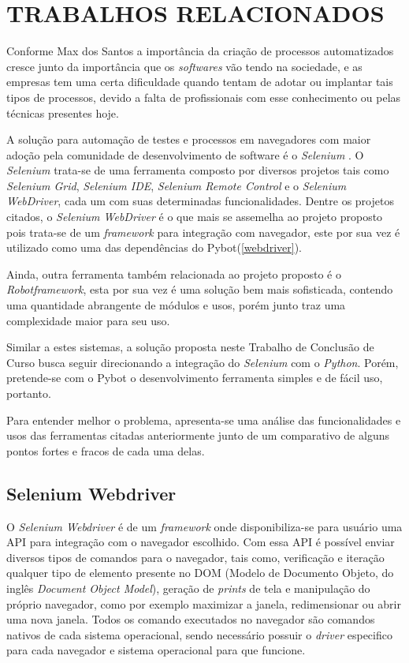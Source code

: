 %
%

\chapter{TRABALHOS RELACIONADOS}\label{chap:relacionados}

    Conforme Max dos Santos \cite{dos2016estudo} a importância da criação de processos automatizados cresce junto da importância que os \textit{softwares} vão tendo na sociedade, e as empresas
    tem uma certa dificuldade quando tentam de adotar ou implantar tais tipos de processos, devido a falta de profissionais com esse conhecimento ou pelas técnicas presentes hoje.

    A solução para automação de testes e processos em navegadores com maior adoção pela comunidade de desenvolvimento de software é o \textit{Selenium} \cite{selenium}.
    O \textit{Selenium} trata-se de uma ferramenta composto por diversos projetos tais como \textit{Selenium Grid}, \textit{Selenium IDE}, \textit{Selenium Remote Control} e o \textit{Selenium WebDriver},
    cada um com suas determinadas funcionalidades. Dentre os projetos citados, o \textit{Selenium WebDriver} é o que mais se assemelha ao projeto proposto pois trata-se de um \textit{framework} para
    integração com navegador, este por sua vez é utilizado como uma das dependências do Pybot(\autoref{webdriver}).

    Ainda, outra ferramenta também relacionada ao projeto proposto é o \textit{Robotframework}, esta por sua vez é uma solução bem mais sofisticada, contendo uma quantidade abrangente de módulos
    e usos, porém junto traz uma complexidade maior para seu uso.

    Similar a estes sistemas, a solução proposta neste Trabalho de Conclusão de Curso busca seguir direcionando a integração do \textit{Selenium} com o \textit{Python}. Porém, pretende-se com o Pybot o
    desenvolvimento ferramenta simples e de fácil uso, portanto.

    Para entender melhor o problema, apresenta-se uma análise das funcionalidades e usos das ferramentas citadas anteriormente junto de um comparativo de alguns pontos fortes e
    fracos de cada uma delas.

    \section{Selenium Webdriver}

        O \textit{Selenium Webdriver} \cite{webdriver} é de um \textit{framework} onde disponibiliza-se para usuário uma API para integração com o navegador escolhido. Com essa API é possível enviar
        diversos tipos de comandos para o navegador, tais como, verificação e iteração qualquer tipo de elemento presente no DOM (Modelo de Documento Objeto, do inglês \textit{Document Object Model}),
        geração de \textit{prints} de tela e manipulação do próprio navegador, como por exemplo maximizar a janela, redimensionar ou abrir uma nova janela. Todos os comando executados no navegador
        são comandos nativos de cada sistema operacional, sendo necessário possuir o \textit{driver} especifico para cada navegador e sistema operacional para que funcione.

